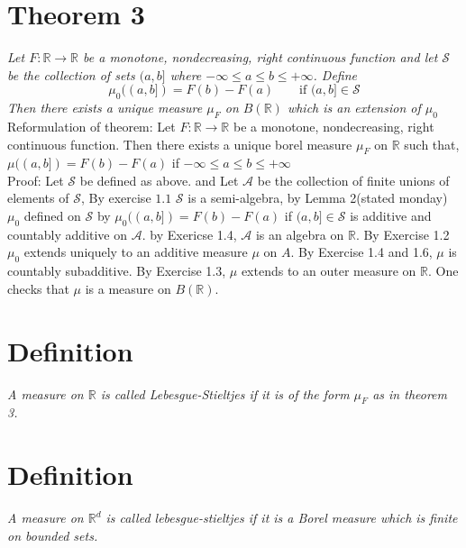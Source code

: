 \documentclass[11pt]{article}
\begin{document}
\section{Theorem 3}
\emph{
    Let $F: \mathbb{R} \rightarrow \mathbb{R}$  be a monotone, nondecreasing, right continuous function and let $\mathcal{S}$ be 
    the collection of sets  $(a,b]$ where  $-\infty \le a \le b \le +\infty$. Define
    \[
        \mu_0((a,b])=  F(b) - F(a) \qquad \text{if $(a,b] \in \mathcal{S}$}
    \] 
    Then there exists a unique measure $\mu_F $ on $B( \mathbb{R})$ which is an extension of $\mu_0$
}\\
Reformulation of theorem: Let $F : \mathbb{R} \rightarrow \mathbb{R}$ be a monotone, nondecreasing, right continuous function. Then there exists
a unique borel measure $\mu_F$ on $ \mathbb{R}$ such that, $\mu((a,b]) = F(b) - F(a)$ if $-\infty \le a \le b \le +\infty$
\\
Proof:
Let $\mathcal{S}$ be defined as above. and Let  $ \mathcal{A}$ be the collection of finite unions of elements of $\mathcal{S}$, By exercise $1.1$ 
$ \mathcal{S}$ is a semi-algebra, by Lemma 2(stated monday) $\mu_0$ defined on $\mathcal{S}$ by  $\mu_0((a,b]) = F(b) - F(a)$ if $(a,b] \in \mathcal{S}$
is additive and countably additive on $ \mathcal{A}$. by Exericse 1.4, $ \mathcal{A}$ is an algebra on $ \mathbb{R}$. By Exercise 1.2 $\mu_0$ extends uniquely to an additive 
measure $ \mu $ on $A$. By Exercise 1.4 and 1.6,  $\mu$ is countably subadditive. By Exercise 1.3, $\mu$ extends to an outer measure on $ \mathbb{R}$. One checks that $\mu$ is a measure on $B( \mathbb{R})$.

\section{Definition}
\emph{
    A measure on $ \mathbb{R}$ is called Lebesgue-Stieltjes if it is  of the form $\mu_F$ as in
    theorem 3.
}

\section{Definition}
\emph{
    A measure on $ \mathbb{R}^{d}$ is called lebesgue-stieltjes if it is a Borel measure which is
    finite on bounded sets.
}
\end{document}

